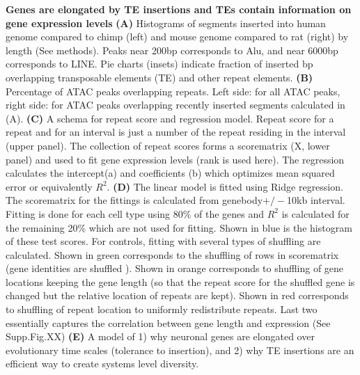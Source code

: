 \textbf{Genes are elongated by TE insertions and TEs contain information on gene expression levels}
\textbf{(A)} Histograms of segments inserted into human genome compared to chimp (left) and mouse genome compared to rat (right) by length (See methods). Peaks near 200bp corresponds to Alu, and near 6000bp corresponds to LINE. Pie charts (insets) indicate fraction of inserted bp overlapping transposable elements (TE) and other repeat elements.
\textbf{(B)} Percentage of ATAC peaks overlapping repeats. Left side: for all ATAC peaks, right side: for ATAC peaks overlapping recently inserted segments calculated in (A). 
\textbf{(C)} A schema for repeat score and regression model. Repeat score for a repeat and for an interval is just a number of the repeat residing in the interval (upper panel). The collection of repeat scores forms a scorematrix (X, lower panel) and used to fit gene expression levels (rank is used here). The regression calculates the intercept(a) and coefficients (b) which optimizes mean squared error or equivalently $R^2$. 
\textbf{(D)} The linear model is fitted using Ridge regression. The scorematrix for the fittings is calculated from genebody$+/-$10kb interval. Fitting is done for each cell type using 80\% of the genes and $R^2$ is calculated for the remaining 20\% which are not used for fitting. Shown in blue is the histogram of these test scores. For controls, fitting with several types of shuffling are calculated. Shown in green corresponds to the shuffling of rows in scorematrix (gene identities are shuffled ). Shown in orange corresponds to shuffling of gene locations keeping the gene length (so that the repeat score for the shuffled gene is changed but the relative location of repeats are kept). Shown in red corresponds to shuffling of repeat location to uniformly redistribute repeats. Last two essentially captures the correlation between gene length and expression (See Supp.Fig.XX)
\textbf{(E)} A model of 1) why neuronal genes are elongated over evolutionary time scales (tolerance to insertion), and 2) why TE insertions are an efficient way to create systems level diversity. 
